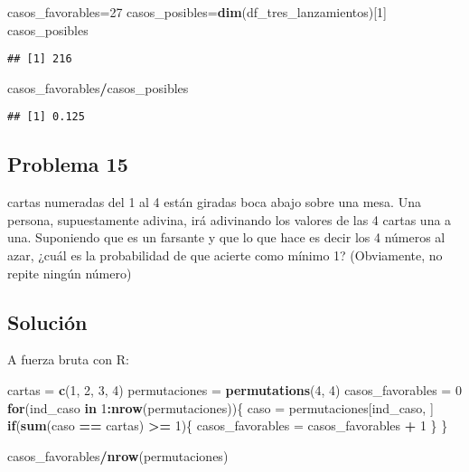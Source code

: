 \documentclass[
]{article}
\newenvironment{Shaded}{\begin{snugshade}}{\end{snugshade}}
\newcommand{\ControlFlowTok}[1]{\textcolor[rgb]{0.13,0.29,0.53}{\textbf{#1}}}
\newcommand{\DecValTok}[1]{\textcolor[rgb]{0.00,0.00,0.81}{#1}}
\newcommand{\KeywordTok}[1]{\textcolor[rgb]{0.13,0.29,0.53}{\textbf{#1}}}
\newcommand{\NormalTok}[1]{#1}
\newcommand{\OperatorTok}[1]{\textcolor[rgb]{0.81,0.36,0.00}{\textbf{#1}}}
\newcommand{\StringTok}[1]{\textcolor[rgb]{0.31,0.60,0.02}{#1}}
\begin{document}
\begin{Shaded}
\begin{Highlighting}[]
\NormalTok{casos_favorables=}\DecValTok{27}
\NormalTok{casos_posibles=}\KeywordTok{dim}\NormalTok{(df_tres_lanzamientos)[}\DecValTok{1}\NormalTok{]}
\NormalTok{casos_posibles}
\end{Highlighting}
\end{Shaded}

\begin{verbatim}
## [1] 216
\end{verbatim}

\begin{Shaded}
\begin{Highlighting}[]
\NormalTok{casos_favorables}\OperatorTok{/}\NormalTok{casos_posibles}
\end{Highlighting}
\end{Shaded}

\begin{verbatim}
## [1] 0.125
\end{verbatim}

\hypertarget{problema-15}{%
\subsection{Problema 15}\label{problema-15}}

cartas numeradas del 1 al 4 están giradas boca abajo sobre una mesa. Una
persona, supuestamente adivina, irá adivinando los valores de las 4
cartas una a una. Suponiendo que es un farsante y que lo que hace es
decir los 4 números al azar, ¿cuál es la probabilidad de que acierte
como mínimo 1? (Obviamente, no repite ningún número)

\hypertarget{soluciuxf3n-11}{%
\subsection{Solución}\label{soluciuxf3n-11}}

A fuerza bruta con R:

\begin{Shaded}
\begin{Highlighting}[]
\NormalTok{cartas =}\StringTok{ }\KeywordTok{c}\NormalTok{(}\DecValTok{1}\NormalTok{, }\DecValTok{2}\NormalTok{, }\DecValTok{3}\NormalTok{, }\DecValTok{4}\NormalTok{)}
\NormalTok{permutaciones =}\StringTok{ }\KeywordTok{permutations}\NormalTok{(}\DecValTok{4}\NormalTok{, }\DecValTok{4}\NormalTok{)}
\NormalTok{casos_favorables =}\StringTok{ }\DecValTok{0}
\ControlFlowTok{for}\NormalTok{(ind_caso }\ControlFlowTok{in} \DecValTok{1}\OperatorTok{:}\KeywordTok{nrow}\NormalTok{(permutaciones))\{}
\NormalTok{  caso =}\StringTok{ }\NormalTok{permutaciones[ind_caso, ]}
  \ControlFlowTok{if}\NormalTok{(}\KeywordTok{sum}\NormalTok{(caso }\OperatorTok{==}\StringTok{ }\NormalTok{cartas) }\OperatorTok{>=}\StringTok{ }\DecValTok{1}\NormalTok{)\{}
\NormalTok{    casos_favorables =}\StringTok{ }\NormalTok{casos_favorables }\OperatorTok{+}\StringTok{ }\DecValTok{1}
\NormalTok{  \}}
\NormalTok{\}}

\NormalTok{casos_favorables}\OperatorTok{/}\KeywordTok{nrow}\NormalTok{(permutaciones)}
\end{Highlighting}
\end{Shaded}
\end{document}
